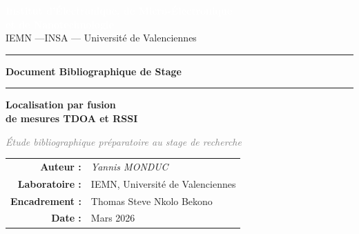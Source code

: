 \documentclass[12pt, a4paper]{article}
\begin{document}

\begin{titlepage}
  \thispagestyle{empty}

  \noindent\colorbox{iemnblue}{%
    \parbox{\textwidth}{%
      \vspace{0.8cm}
      \centering
      \textcolor{white}{\Large\bfseries
        Institut d'Électronique, de Micro-Électronique\\[4pt]
        et de Nanotechnologie}\\[6pt]
      \textcolor{white!70!iemnblue}{\normalsize IEMN —INSA — Université de Valenciennes}
      \vspace{0.8cm}
    }%
  }

  \vspace{2cm}

  {\centering
    \textcolor{iemnblue}{\rule{0.15\linewidth}{2pt}}
    \hspace{0.5em}
    \textcolor{iemnaccent}{\Large\bfseries Document Bibliographique de Stage}
    \hspace{0.5em}
    \textcolor{iemnblue}{\rule{0.15\linewidth}{2pt}}
    \par
  }

  \vspace{1.2cm}

  {\centering
    \textcolor{iemnblue}{\Huge\bfseries
      Localisation par fusion\\[8pt]
      de mesures TDOA et RSSI}
    \par
  }

  \vspace{0.8cm}

  {\centering
    \textcolor{gray}{\large\itshape
      Étude bibliographique préparatoire au stage de recherche}
    \par
  }

  \vspace{2cm}

  \begin{center}
  \begin{tcolorbox}[
    width=0.82\textwidth,
    colback=boxbg, colframe=iemnblue,
    arc=6pt, left=14pt, right=14pt, top=10pt, bottom=10pt
  ]
    \centering
    \begin{tabular}{rl}
      \textbf{Auteur :}       & \textit{Yannis MONDUC}\\[4pt]
      \textbf{Laboratoire :}  & IEMN, Université de Valenciennes\\[4pt]
      \textbf{Encadrement :}  & Thomas Steve Nkolo Bekono\\
                              
      \textbf{Date :}         & Mars 2026
    \end{tabular}
  \end{tcolorbox}
  \end{center}

  \vspace{1.5cm}

  
\end{titlepage}
\end{document}
